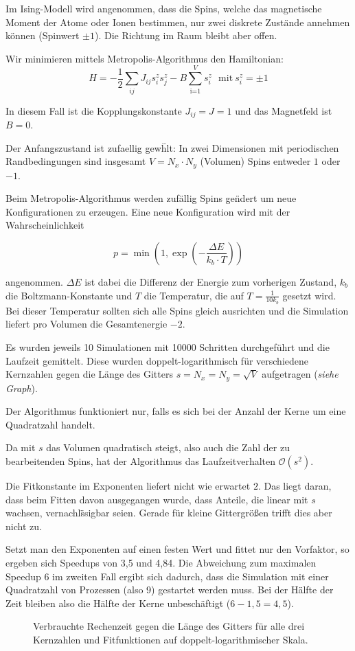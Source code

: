 \documentclass[12pt]{scrartcl}
\begin{document}
Im Ising-Modell wird angenommen, dass die Spins, welche das magnetische Moment der Atome oder Ionen bestimmen, nur zwei diskrete Zustände annehmen können (Spinwert $\pm 1$). Die Richtung im Raum bleibt aber offen.

Wir minimieren mittels Metropolis-Algorithmus den Hamiltonian:
\begin{equation}
H = -\frac{1}{2}\sum_{ij} J_{ij}s^z_is^z_j - B\sum_{\text{i=1}}^Vs_i^{z} ~~~ \text{mit} ~ s_i^z = \pm 1
\end{equation}

In diesem Fall ist die Kopplungskonstante $J_{ij}=J=1$ und das Magnetfeld ist $B = 0$. 

Der Anfangszustand ist zufaellig gew\"hlt: In zwei Dimensionen mit periodischen Randbedingungen sind insgesamt $V = N_x\cdot N_y$ (Volumen) Spins entweder $1$ oder $-1$. 

Beim Metropolis-Algorithmus werden zuf\"allig Spins ge\"ndert um neue Konfigurationen zu erzeugen. Eine neue Konfiguration wird mit der Wahrscheinlichkeit 

\begin{equation}
p = \min\left( 1, \exp\left(-\frac{\Delta E}{k_b\cdot T}\right) \right)
\end{equation}

angenommen. $\Delta E$ ist dabei die Differenz der Energie zum vorherigen Zustand, $k_b$ die Boltzmann-Konstante und $T$ die Temperatur, die auf $T=\frac{1}{10k_b}$ gesetzt wird. Bei dieser Temperatur sollten sich alle Spins gleich ausrichten und die Simulation liefert pro Volumen die Gesamtenergie $-2$.

Es wurden jeweils 10 Simulationen mit 10000 Schritten durchgef\"uhrt und die Laufzeit gemittelt. Diese wurden doppelt-logarithmisch f\"ur verschiedene Kernzahlen gegen die L\"ange des Gitters $s=N_x=N_y=\sqrt{V}$ aufgetragen (\textit{siehe Graph}).

Der Algorithmus funktioniert nur, falls es sich bei der Anzahl der Kerne um eine Quadratzahl handelt.

Da mit $s$ das Volumen quadratisch steigt, also auch die Zahl der zu bearbeitenden Spins, hat der Algorithmus das Laufzeitverhalten $\mathcal{O}(s^2)$.

Die Fitkonstante im Exponenten liefert nicht wie erwartet $2$. Das liegt daran, dass beim Fitten davon ausgegangen wurde, dass Anteile, die linear mit $s$ wachsen, vernachl\"ssigbar seien. Gerade f\"ur kleine Gittergr\"o\ss en trifft dies aber nicht zu. 

Setzt man den Exponenten auf einen festen Wert und fittet nur den Vorfaktor, so ergeben sich Speedups von 3,5 und 4,84. Die Abweichung zum maximalen Speedup 6 im zweiten Fall ergibt sich dadurch, dass die Simulation mit einer Quadratzahl von Prozessen (also 9) gestartet werden muss. Bei der H\"alfte der Zeit bleiben also die H\"alfte der Kerne unbesch\"aftigt ($6 - 1,5 = 4,5$).

\begin{figure}
\scalebox{1.1}{}
\caption*{Verbrauchte Rechenzeit gegen die L\"ange des Gitters f\"ur alle drei Kernzahlen und Fitfunktionen auf doppelt-logarithmischer Skala.}
\end{figure}
\end{document}
